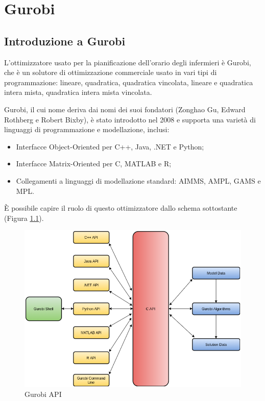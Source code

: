 \chapter{Gurobi}

\section{Introduzione a Gurobi}
L'ottimizzatore usato per la pianificazione dell'orario degli infermieri è Gurobi, che è un solutore di ottimizzazione commerciale usato in vari tipi di programmazione: lineare, quadratica, quadratica vincolata, lineare e quadratica intera mista, quadratica intera mista vincolata.

Gurobi, il cui nome deriva dai nomi dei suoi fondatori (Zonghao Gu, Edward Rothberg e Robert Bixby), è stato introdotto nel 2008 e supporta una varietà di linguaggi di programmazione e modellazione, inclusi:
\begin{itemize}
\item Interfacce Object-Oriented per C++, Java, .NET e Python;
\item Interfacce Matrix-Oriented per C, MATLAB e R;
\item Collegamenti a linguaggi di modellazione standard: AIMMS, AMPL, GAMS e MPL.
\end{itemize}

È possibile capire il ruolo di questo ottimizzatore dallo schema sottostante (Figura \ref{fig:Gurobi}).
\begin{figure}[!h]
		\centering
		\includegraphics[scale=0.5]{img/gurobi_c.png}
		\caption{Gurobi API}
		\label{fig:Gurobi}
\end{figure}

